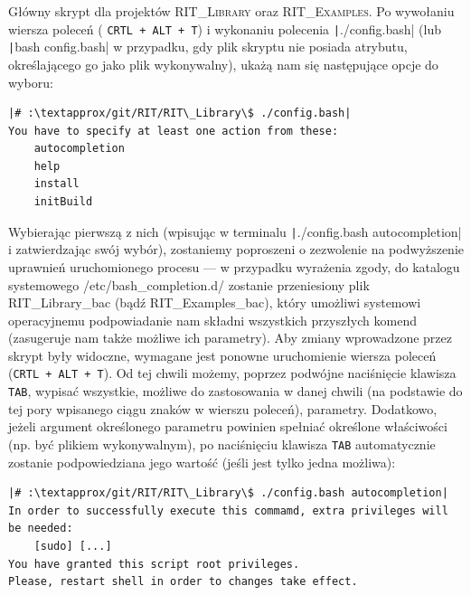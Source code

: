 
Główny skrypt dla projektów \textsc{RIT\_Library} oraz \textsc{RIT\_Examples}. Po wywołaniu wiersza poleceń ( \texttt{CRTL + ALT + T}) i wykonaniu polecenia \texttt|./config.bash| (lub \texttt|bash config.bash| w przypadku, gdy plik skryptu nie posiada atrybutu, określającego go jako plik wykonywalny), ukażą nam się następujące opcje do wyboru:

\begin{verbatim}
|# :\textapprox/git/RIT/RIT\_Library\$ ./config.bash|
You have to specify at least one action from these:
	autocompletion
	help
	install
	initBuild
\end{verbatim}

Wybierając pierwszą z nich (wpisując w terminalu \texttt|./config.bash autocompletion| i zatwierdzając swój wybór), zostaniemy poproszeni o zezwolenie na podwyższenie uprawnień uruchomionego procesu --- w przypadku wyrażenia zgody, do katalogu systemowego \textsf{\textapprox/etc/bash\_completion.d/} zostanie przeniesiony plik \textsf{RIT\_Library\_bac} (bądź \textsf{RIT\_Examples\_bac}), który umożliwi systemowi operacyjnemu podpowiadanie nam składni wszystkich przyszłych komend (zasugeruje nam także możliwe ich parametry). Aby zmiany wprowadzone przez skrypt były widoczne, wymagane jest ponowne uruchomienie wiersza poleceń (\texttt{CRTL + ALT + T}). Od tej chwili możemy, poprzez podwójne naciśnięcie klawisza \texttt{TAB}, wypisać wszystkie, możliwe do zastosowania w danej chwili (na podstawie do tej pory wpisanego ciągu znaków w wierszu poleceń), parametry. Dodatkowo, jeżeli argument określonego parametru powinien spełniać określone właściwości (np. być plikiem wykonywalnym), po naciśnięciu klawisza \texttt{TAB} automatycznie zostanie podpowiedziana jego wartość (jeśli jest tylko jedna możliwa):

\begin{verbatim}
|# :\textapprox/git/RIT/RIT\_Library\$ ./config.bash autocompletion|
In order to successfully execute this commamd, extra privileges will be needed:
	[sudo] [...]
You have granted this script root privileges.
Please, restart shell in order to changes take effect.
\end{verbatim}

